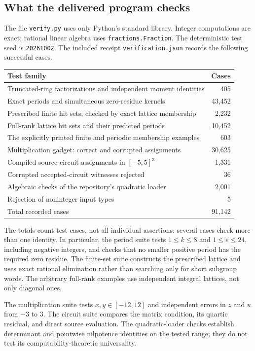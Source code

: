 \documentclass[11pt,letterpaper]{article}
\theoremstyle{definition}
\theoremstyle{remark}
\begin{document}
\subsection{What the delivered program checks}
The file \texttt{verify.py} uses only Python's standard library. Integer computations are exact; rational linear algebra uses \texttt{fractions.Fraction}. The deterministic test seed is \texttt{20261002}. The included receipt \texttt{verification.json} records the following successful cases.
\begin{center}
\begin{tabular}{p{}r}
\toprule
Test family & Cases\\
\midrule
Truncated-ring factorizations and independent moment identities & 405\\
Exact periods and simultaneous zero-residue kernels & 43,452\\
Prescribed finite hit sets, checked by exact lattice membership & 2,232\\
Full-rank lattice hit sets and their predicted periods & 10,452\\
The explicitly printed finite and periodic membership examples & 603\\
Multiplication gadget: correct and corrupted assignments & 30,625\\
Compiled source-circuit assignments in $[-5,5]^3$ & 1,331\\
Corrupted accepted-circuit witnesses rejected & 36\\
Algebraic checks of the repository's quadratic loader & 2,001\\
Rejection of noninteger input types & 5\\
\midrule
Total recorded cases & 91,142\\
\bottomrule
\end{tabular}
\end{center}
The totals count test cases, not all individual assertions: several cases check more than one identity. In particular, the period suite tests $1\le k\le8$ and $1\le e\le24$, including negative integers, and checks that no smaller positive period has the required zero residue. The finite-set suite constructs the prescribed lattice and uses exact rational elimination rather than searching only for short subgroup words. The arbitrary full-rank examples use independent integral lattices, not only diagonal ones.

The multiplication suite tests $x,y\in[-12,12]$ and independent errors in $z$ and $u$ from $-3$ to $3$. The circuit suite compares the matrix condition, its quartic residual, and direct source evaluation. The quadratic-loader checks establish determinant and pointwise nilpotence identities on the tested range; they do not test its computability-theoretic universality.
\end{document}
